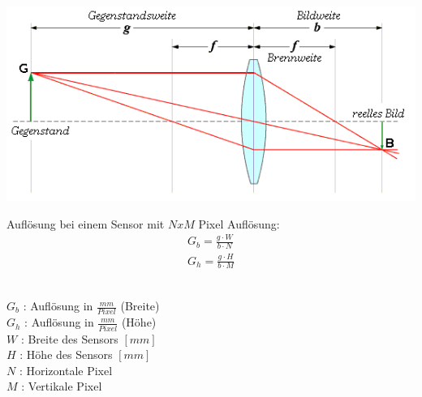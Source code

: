\begin{center}
	\includegraphics[scale=0.35]{./images/linse.png}
\end{center}
Auflösung bei einem Sensor mit $NxM$ Pixel Auflösung:
\[
	\begin{aligned}
		G_{b} = \frac{g \cdot W}{b \cdot N}\\
		G_{h} = \frac{g \cdot H}{b \cdot M}
	\end{aligned}
\]\\
\begin{footnotesize}
	$G_b$ : Auflösung in $\frac{mm}{Pixel}$ (Breite)\\
	$G_h$ : Auflösung in $\frac{mm}{Pixel}$ (Höhe)\\
	$W$ : Breite des Sensors $[mm]$\\
	$H$ : Höhe des Sensors $[mm]$\\
	$N$ : Horizontale Pixel\\
	$M$ : Vertikale Pixel \\	
\end{footnotesize}
\\\\

